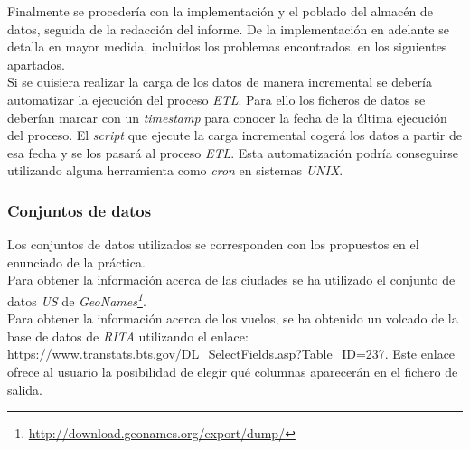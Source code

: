\documentclass{article}
\begin{document}
Finalmente se procedería con la implementación y el poblado del almacén de datos, seguida de la redacción del informe. De la implementación en adelante se detalla en mayor medida, incluidos los problemas encontrados, en los siguientes apartados.\\

Si se quisiera realizar la carga de los datos de manera incremental se debería automatizar la ejecución del proceso \textit{ETL}. Para ello los ficheros de datos se deberían marcar con un \textit{timestamp} para conocer la fecha de la última ejecución del proceso. El \textit{script} que ejecute la carga incremental cogerá los datos a partir de esa fecha y se los pasará al proceso \textit{ETL}. Esta automatización podría conseguirse utilizando alguna herramienta como \textit{cron} en sistemas \textit{UNIX}.\\
 
\newpage
\subsubsection{Conjuntos de datos}

Los conjuntos de datos utilizados se corresponden con los propuestos en el enunciado de la práctica.\\
Para obtener la información acerca de las ciudades se ha utilizado el conjunto de datos \textit{US} de \textit{GeoNames\footnote{\url{http://download.geonames.org/export/dump/}}}.\\
Para obtener la información acerca de los vuelos, se ha obtenido un volcado de la base de datos de \textit{RITA} utilizando el enlace: \url{https://www.transtats.bts.gov/DL_SelectFields.asp?Table_ID=237}. Este enlace ofrece al usuario la posibilidad de elegir qué columnas aparecerán en el fichero de salida.\\
\end{document}
